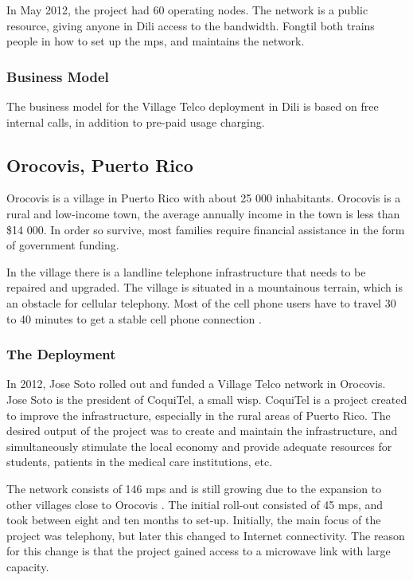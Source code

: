 In May 2012, the project had 60 operating nodes. The network is a public resource, giving anyone in Dili access to the bandwidth. Fongtil both trains people in how to set up the \glspl{mp}, and maintains the network.


\subsubsection{Business Model}
The business model for the Village Telco deployment in Dili is based on free internal calls, in addition to pre-paid usage charging.  

\subsection{Orocovis, Puerto Rico}
Orocovis is a village in Puerto Rico with about 25 000 inhabitants. Orocovis is a rural and low-income town, the average annually income in the town is less than \$14 000. In order so survive, most families require financial assistance in the form of government funding.   

In the village there is a landline telephone infrastructure that needs to be repaired and upgraded. The village is situated in a mountainous terrain, which is an obstacle for cellular telephony. Most of the cell phone users have to travel 30 to 40 minutes to get a stable cell phone connection \cite{vtpuertorico, soto}. 

\subsubsection{The Deployment}
In 2012, Jose Soto rolled out and funded a Village Telco network in Orocovis. Jose Soto is the president of CoquiTel, a small \gls{wisp}. CoquiTel is a project created to improve the infrastructure, especially in the rural areas of Puerto Rico. The desired output of the project was to create and maintain the infrastructure, and simultaneously stimulate the local economy and provide adequate resources for students, patients in the medical care institutions, etc.

The network consists of 146 \glspl{mp} and is still growing due to the expansion to other villages close to Orocovis \cite{vtpuertorico}. The initial roll-out consisted of 45 \glspl{mp}, and took between eight and ten months to set-up. Initially, the main focus of the project was telephony, but later this changed to Internet connectivity. The reason for this change is that the project gained access to a microwave link with large capacity. 

